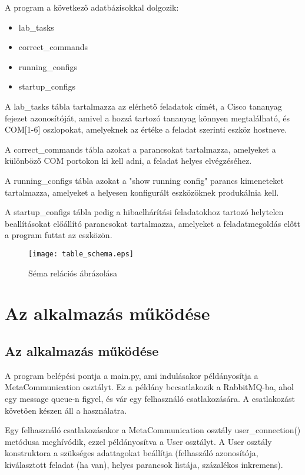 \documentclass[12pt]{report}
\begin{document}
A program a következő adatbázisokkal dolgozik:

\singlespacing
\begin{itemize}
    \item lab\_tasks
    \item correct\_commands
    \item running\_configs
    \item startup\_configs
\end{itemize}

\onehalfspacing

A lab\_tasks tábla tartalmazza az elérhető feladatok címét, a Cisco tananyag fejezet azonosítóját, amivel a hozzá tartozó tananyag könnyen megtalálható, és COM[1-6] oszlopokat, amelyeknek az értéke a feladat szerinti eszköz hostneve.

A correct\_commands tábla azokat a parancsokat tartalmazza, amelyeket a különböző COM portokon ki kell adni, a feladat helyes elvégzéséhez.

A running\_configs tábla azokat a "show running config" parancs kimeneteket tartalmazza, amelyeket a helyesen konfigurált eszközöknek produkálnia kell.


A startup\_configs tábla pedig a hibaelhárítási feladatokhoz tartozó helytelen beallításokat előállító parancsokat tartalmazza, amelyeket a feladatmegoldás előtt a program futtat az eszközön.

\begin{figure}[h]
    \centering
    \texttt{[image: table\_schema.eps]}
    \caption{Séma relációs ábrázolása}
\end{figure}

\chapter{Az alkalmazás működése}
\section{Az alkalmazás működése}


A program belépési pontja a main.py, ami indulásakor példányosítja a MetaCommunication osztályt.
Ez a példány becsatlakozik a RabbitMQ-ba, ahol egy message queue-n figyel, és vár egy felhasználó csatlakozására. A csatlakozást követően készen áll a használatra.

Egy felhasználó csatlakozásakor a MetaCommunication osztály user\_connection() metódusa meghívódik, ezzel példányosítva a User osztályt. A User osztály konstruktora a szükséges adattagokat beállítja (felhaszáló azonosítója, kiválasztott feladat (ha van), helyes parancsok listája, százalékos inkremens).
\end{document}
